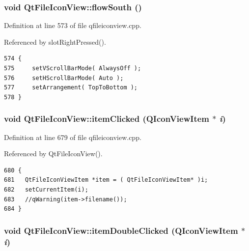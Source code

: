 \subsubsection{\setlength{\rightskip}{0pt plus 5cm}void Qt\-File\-Icon\-View::flow\-South ()\hspace{0.3cm}{\tt  [protected, slot]}}\label{classQtFileIconView_QtFileIconViewj8}




Definition at line 573 of file qfileiconview.cpp.

Referenced by slot\-Right\-Pressed().



\footnotesize\begin{verbatim}574 {
575     setVScrollBarMode( AlwaysOff );
576     setHScrollBarMode( Auto );
577     setArrangement( TopToBottom );
578 }
\end{verbatim}\normalsize 
{}
\subsubsection{\setlength{\rightskip}{0pt plus 5cm}void Qt\-File\-Icon\-View::item\-Clicked (QIcon\-View\-Item $\ast$ {\em i})\hspace{0.3cm}{\tt  [protected, slot]}}\label{classQtFileIconView_QtFileIconViewj1}




Definition at line 679 of file qfileiconview.cpp.

Referenced by Qt\-File\-Icon\-View().



\footnotesize\begin{verbatim}680 {
681   QtFileIconViewItem *item = ( QtFileIconViewItem* )i;
682   setCurrentItem(i);
683   //qWarning(item->filename());
684 }\end{verbatim}\normalsize 
{}
\subsubsection{\setlength{\rightskip}{0pt plus 5cm}void Qt\-File\-Icon\-View::item\-Double\-Clicked (QIcon\-View\-Item $\ast$ {\em i})\hspace{0.3cm}{\tt  [protected, slot]}}\label{classQtFileIconView_QtFileIconViewj0}





